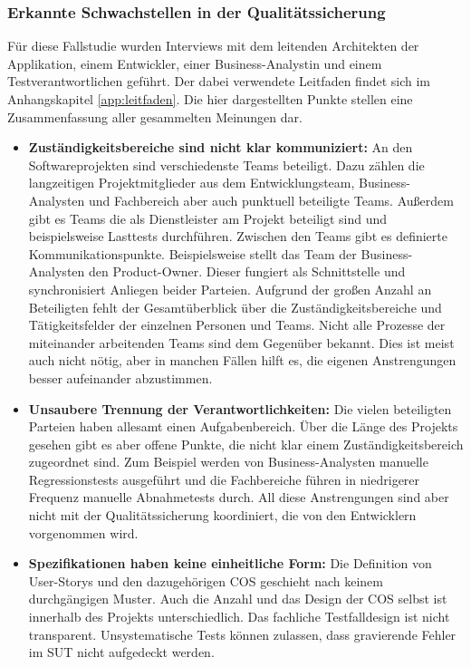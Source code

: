 \subsubsection{Erkannte Schwachstellen in der Qualitätssicherung}
\label{sec:schwachstellen_raiffeisen}
Für diese Fallstudie wurden Interviews mit dem leitenden Architekten der Applikation, einem Entwickler, einer Business-Analystin und einem Testverantwortlichen geführt. Der dabei verwendete Leitfaden findet sich im Anhangskapitel \ref{app:leitfaden}. Die hier dargestellten Punkte stellen eine Zusammenfassung aller gesammelten Meinungen dar.\\
\begin{itemize}
\item \textbf{Zuständigkeitsbereiche sind nicht klar kommuniziert:} An den Softwareprojekten sind verschiedenste Teams beteiligt. Dazu zählen die langzeitigen Projektmitglieder aus dem Entwicklungsteam, Business-Analysten und Fachbereich aber auch punktuell beteiligte Teams. Außerdem gibt es Teams die als Dienstleister am Projekt beteiligt sind und beispielsweise Lasttests durchführen. Zwischen den Teams gibt es definierte Kommunikationspunkte. Beispielsweise stellt das Team der Business-Analysten den Product-Owner. Dieser fungiert als Schnittstelle und synchronisiert Anliegen beider Parteien. Aufgrund der großen Anzahl an Beteiligten fehlt der Gesamtüberblick über die Zuständigkeitsbereiche und Tätigkeitsfelder der einzelnen Personen und Teams. Nicht alle Prozesse der miteinander arbeitenden Teams sind dem Gegenüber bekannt. Dies ist meist auch nicht nötig, aber in manchen Fällen hilft es, die eigenen Anstrengungen besser aufeinander abzustimmen.
\item \textbf{Unsaubere Trennung der Verantwortlichkeiten:} Die vielen beteiligten Parteien haben allesamt einen Aufgabenbereich. Über die Länge des Projekts gesehen gibt es aber offene Punkte, die nicht klar einem Zuständigkeitsbereich zugeordnet sind. Zum Beispiel werden von Business-Analysten manuelle Regressionstests ausgeführt und die Fachbereiche führen in niedrigerer Frequenz manuelle Abnahmetests durch. All diese Anstrengungen sind aber nicht mit der Qualitätssicherung koordiniert, die von den Entwicklern vorgenommen wird.
\item \textbf{Spezifikationen haben keine einheitliche Form:} Die Definition von User-Storys und den dazugehörigen \Gls{COS} geschieht nach keinem durchgängigen Muster. Auch die Anzahl und das Design der \Gls{COS} selbst ist innerhalb des Projekts unterschiedlich. Das fachliche Testfalldesign ist nicht transparent. Unsystematische Tests können zulassen, dass gravierende Fehler im \Gls{SUT} nicht aufgedeckt werden.
\end{itemize}

